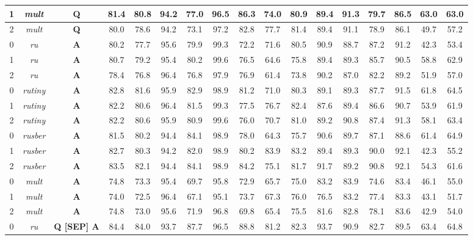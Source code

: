 \begin{table}[]
{\begin{tabular}{|c|c||c|c|c|c|c|c|c|c|c|c|c|c|c|c|c|}
1 & \textit{mult} &  \textbf{Q} & 81.4 & 80.8 & 94.2 & 77.0 & 96.5 & 86.3 & 74.0 & 80.9 & 89.4 & 91.3 & 79.7 & 86.5 & 63.0 & 63.0\\ \hline
2 & \textit{mult} &  \textbf{Q} & 80.0 & 78.6 & 94.2 & 73.1 & 97.2 & 82.8 & 77.7 & 81.4 & 89.4 & 91.1 & 78.9 & 86.1 & 49.7 & 57.2\\ \hline
0 & \textit{ru} &  \textbf{A} & 80.2 & 77.7 & 95.6 & 79.9 & 99.3 & 72.2 & 71.6 & 80.5 & 90.9 & 88.7 & 87.2 & 91.2 & 42.3 & 53.4\\ \hline
1 & \textit{ru} &  \textbf{A} & 80.7 & 79.2 & 95.4 & 80.2 & 99.6 & 76.5 & 64.6 & 75.8 & 89.4 & 89.3 & 85.7 & 90.5 & 58.8 & 62.9\\ \hline
2 & \textit{ru} &  \textbf{A} & 78.4 & 76.8 & 96.4 & 76.8 & 97.9 & 76.9 & 61.4 & 73.8 & 90.2 & 87.0 & 82.2 & 89.2 & 51.9 & 57.0\\ \hline
0 & \textit{rutiny} &  \textbf{A} & 82.8 & 81.6 & 95.9 & 82.9 & 98.9 & 81.2 & 71.0 & 80.3 & 89.1 & 89.3 & 87.7 & 91.5 & 61.8 & 64.5\\ \hline
1 & \textit{rutiny} &  \textbf{A} & 82.2 & 80.6 & 96.4 & 81.5 & 99.3 & 77.5 & 76.7 & 82.4 & 87.6 & 89.4 & 86.6 & 90.7 & 53.9 & 61.9\\ \hline
2 & \textit{rutiny} &  \textbf{A} & 82.2 & 80.6 & 95.9 & 80.9 & 99.6 & 76.0 & 70.7 & 81.0 & 89.2 & 90.8 & 87.4 & 91.3 & 58.1 & 63.4\\ \hline
0 & \textit{rusber} &  \textbf{A} & 81.5 & 80.2 & 94.4 & 84.1 & 98.9 & 78.0 & 64.3 & 75.7 & 90.6 & 89.7 & 87.1 & 88.6 & 61.4 & 64.9\\ \hline
1 & \textit{rusber} &  \textbf{A} & 82.7 & 80.3 & 94.2 & 82.0 & 98.9 & 80.2 & 83.9 & 83.2 & 89.4 & 89.3 & 90.0 & 92.1 & 42.3 & 55.2\\ \hline
2 & \textit{rusber} &  \textbf{A} & 83.5 & 82.1 & 94.4 & 84.1 & 98.9 & 84.2 & 75.1 & 81.7 & 91.7 & 89.2 & 90.8 & 92.1 & 54.3 & 61.6\\ \hline
0 & \textit{mult} &  \textbf{A} & 74.8 & 73.3 & 95.4 & 69.7 & 95.8 & 72.9 & 65.7 & 75.0 & 83.2 & 83.9 & 74.6 & 83.4 & 46.1 & 55.0\\ \hline
1 & \textit{mult} &  \textbf{A} & 74.0 & 72.5 & 96.4 & 67.1 & 95.1 & 73.7 & 67.3 & 76.0 & 76.5 & 83.2 & 77.4 & 83.3 & 43.1 & 51.7\\ \hline
2 & \textit{mult} &  \textbf{A} & 74.8 & 73.0 & 95.6 & 71.9 & 96.8 & 69.8 & 65.4 & 75.5 & 81.6 & 82.8 & 78.1 & 83.6 & 42.9 & 54.0\\ \hline
0 & \textit{ru} &  \textbf{Q [SEP] A} & 84.4 & 84.0 & 93.7 & 87.7 & 96.5 & 88.8 & 81.2 & 82.3 & 93.7 & 90.9 & 82.7 & 89.5 & 63.4 & 64.8\\ \hline

\end{tabular}}
\end{table}
